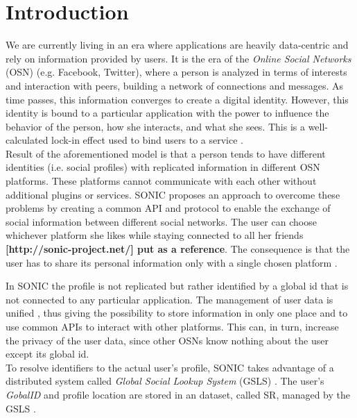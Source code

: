 \section{Introduction}
\label{S:1}

We are currently living in an era where applications are heavily data-centric and rely on information provided by users. It is the era of the \textit{Online Social Networks} (OSN) \cite{gondor_sonic:_2014} (e.g. Facebook, Twitter), where a person is analyzed in terms of interests and interaction with peers, building a network of connections and messages. As time passes, this information converges to create a digital identity. However, this identity is bound to a particular application with the power to influence the behavior of the person, how she interacts, and what she sees. This is a well-calculated lock-in effect used to bind users to a service \cite{gondor_distributed_2016}. 
\\

Result of the aforementioned model is that a person tends to have different identities (i.e. social profiles) with replicated information in different OSN platforms. These platforms cannot communicate with each other without additional plugins or services. SONIC \cite{gondor_sonic:_2014} proposes an approach to overcome these problems by creating a common API and protocol to enable the exchange of social information between different social networks. The user can choose whichever platform she likes while staying connected to all her friends \textbf{[http://sonic-project.net/] put as a reference}. The consequence is that the user has to share its personal information only with a single chosen platform \cite{gondor_sonic:_2014}. 

In SONIC the profile is not replicated but rather identified by a global id that is not connected to any particular application. The management of user data is unified \cite{identity_mgmt_2003}, thus giving the possibility to store information in only one place and to use common APIs to interact with other platforms. This can, in turn, increase the privacy of the user data, since other OSNs know nothing about the user except its global id.
\\

To resolve identifiers to the actual user's profile, SONIC takes advantage of a distributed system called \textit{Global Social Lookup System} (GSLS) \cite{gondor_distributed_2016}. The user's \textit{GobalID} and profile location are stored in an dataset, called SR, managed by the GSLS \cite{gondor_distributed_2016}.
\\

